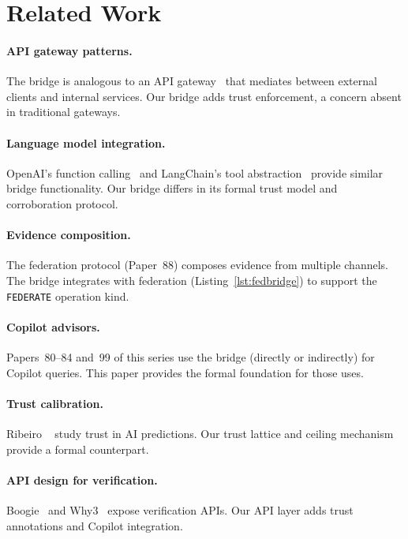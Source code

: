 \documentclass[11pt]{article}
\begin{document}
\section{Related Work}\label{sec:related}

\paragraph{API gateway patterns.}
The bridge is analogous to an API
gateway~\cite{newman2015microservices} that mediates
between external clients and internal services.  Our
bridge adds trust enforcement, a concern absent in
traditional gateways.

\paragraph{Language model integration.}
OpenAI's function
calling~\cite{openai2023functions} and LangChain's tool
abstraction~\cite{chase2023langchain} provide similar
bridge functionality.  Our bridge differs in its formal
trust model and corroboration protocol.

\paragraph{Evidence composition.}
The federation protocol (Paper~88) composes evidence from
multiple channels.  The bridge integrates with federation
(Listing~\ref{lst:fedbridge}) to support the
\texttt{FEDERATE} operation kind.

\paragraph{Copilot advisors.}
Papers~80--84 and~99 of this series use the bridge
(directly or indirectly) for Copilot queries.  This paper
provides the formal foundation for those uses.

\paragraph{Trust calibration.}
Ribeiro \etal{}~\cite{ribeiro2020trust} study trust in
AI predictions.  Our trust lattice and ceiling mechanism
provide a formal counterpart.

\paragraph{API design for verification.}
Boogie~\cite{barnett2006boogie} and Why3~\cite{filliatre2013why3}
expose verification APIs.  Our API layer adds trust
annotations and Copilot integration.
\end{document}
